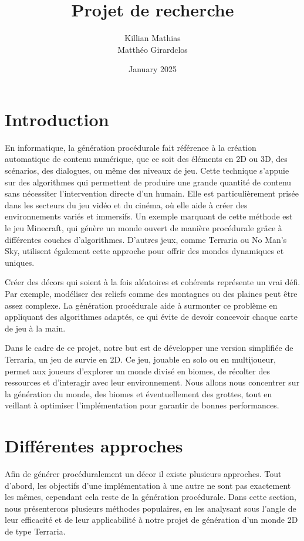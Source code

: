 \documentclass{article}
\title{Projet de recherche}
\author{Killian Mathias\\ Matthéo Girardclos}
\date{January 2025}
\begin{document}
\maketitle
\tableofcontents
\newpage
\section{Introduction}

En informatique, la génération procédurale fait référence à la création automatique de contenu numérique, que ce soit des éléments en 2D ou 3D, des scénarios, des dialogues, ou même des niveaux de jeu. Cette technique s'appuie sur des algorithmes qui permettent de produire une grande quantité de contenu sans nécessiter l'intervention directe d'un humain. Elle est particulièrement prisée dans les secteurs du jeu vidéo et du cinéma, où elle aide à créer des environnements variés et immersifs.  Un exemple marquant de cette méthode est le jeu Minecraft, qui génère un monde ouvert de manière procédurale grâce à différentes couches d'algorithmes. D'autres jeux, comme Terraria ou No Man’s Sky, utilisent également cette approche pour offrir des mondes dynamiques et uniques.\par
Créer des décors qui soient à la fois aléatoires et cohérents représente un vrai défi. Par exemple, modéliser des reliefs comme des montagnes ou des plaines peut être assez complexe. La génération procédurale aide à surmonter ce problème en appliquant des algorithmes adaptés, ce qui évite de devoir concevoir chaque carte de jeu à la main.\par
  Dans le cadre de ce projet, notre but est de développer une version simplifiée de Terraria, un jeu de survie en 2D. Ce jeu, jouable en solo ou en multijoueur, permet aux joueurs d'explorer un monde divisé en biomes, de récolter des ressources et d'interagir avec leur environnement. Nous allons nous concentrer sur la génération du monde, des biomes et éventuellement des grottes, tout en veillant à optimiser l'implémentation pour garantir de bonnes performances.


\section{Différentes approches}

Afin de générer procéduralement un décor il existe plusieurs approches. Tout d'abord, les objectifs d'une implémentation à une autre ne sont pas exactement les mêmes, cependant cela reste de la génération procédurale. Dans cette section, nous présenterons plusieurs méthodes populaires, en les analysant sous l’angle de leur efficacité et de leur applicabilité à notre projet de génération d’un monde 2D de type Terraria.\par
\end{document}
